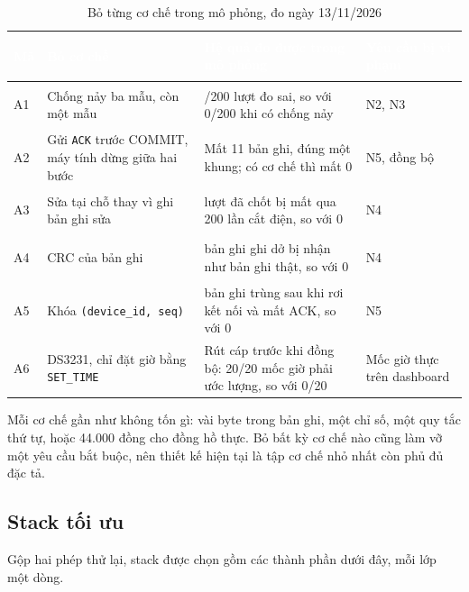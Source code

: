 \begin{table}[H]
    \centering
    \small
    \renewcommand{\arraystretch}{1.3}
    \caption{Bỏ từng cơ chế trong mô phỏng, đo ngày 13/11/2026}
    \label{tab:ablation}
    \begin{tabular}{>{\bfseries\raggedright\arraybackslash}m{0.7cm} >{\raggedright\arraybackslash}m{3.6cm} >{\raggedright\arraybackslash}m{7.0cm} >{\raggedright\arraybackslash}m{2.2cm}}
        \toprule
        \rowcolor{haitayblue}
        \textcolor{white}{Mã} & \textcolor{white}{Bỏ cơ chế} & \textcolor{white}{Hệ quả đo được trong mô phỏng} & \textcolor{white}{Yêu cầu bị vi phạm} \\
        \midrule
        \rowcolor{haitayblue!8}
        A1 & Chống nảy ba mẫu, còn một mẫu & 198/200 lượt đo sai, so với 0/200 khi có chống nảy & N2, N3 \\
        A2 & Gửi \texttt{ACK} trước COMMIT, máy tính dừng giữa hai bước & Mất 11 bản ghi, đúng một khung; có cơ chế thì mất 0 & N5, đồng bộ \\
        \rowcolor{haitayblue!8}
        A3 & Sửa tại chỗ thay vì ghi bản ghi sửa & 28 lượt đã chốt bị mất qua 200 lần cắt điện, so với 0 & N4 \\
        A4 & CRC của bản ghi & 184 bản ghi ghi dở bị nhận như bản ghi thật, so với 0 & N4 \\
        \rowcolor{haitayblue!8}
        A5 & Khóa \texttt{(device\_id, seq)} & 11 bản ghi trùng sau khi rơi kết nối và mất ACK, so với 0 & N5 \\
        A6 & DS3231, chỉ đặt giờ bằng \texttt{SET\_TIME} & Rút cáp trước khi đồng bộ: 20/20 mốc giờ phải ước lượng, so với 0/20 & Mốc giờ thực trên dashboard \\
        \bottomrule
    \end{tabular}
\end{table}

Mỗi cơ chế gần như không tốn gì: vài byte trong bản ghi, một chỉ số, một quy tắc thứ tự, hoặc 44.000 đồng cho đồng hồ thực. Bỏ bất kỳ cơ chế nào cũng làm vỡ một yêu cầu bắt buộc, nên thiết kế hiện tại là tập cơ chế nhỏ nhất còn phủ đủ đặc tả.

\subsection{Stack tối ưu}
Gộp hai phép thử lại, stack được chọn gồm các thành phần dưới đây, mỗi lớp một dòng.


